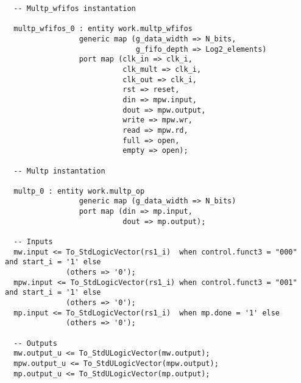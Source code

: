 \begin{code}
\begin{verbatim}
  -- Multp_wfifos instantation

  multp_wfifos_0 : entity work.multp_wfifos
                 generic map (g_data_width => N_bits,
                              g_fifo_depth => Log2_elements)
                 port map (clk_in => clk_i,
                           clk_mult => clk_i,
                           clk_out => clk_i,
                           rst => reset,
                           din => mpw.input,
                           dout => mpw.output,
                           write => mpw.wr,
                           read => mpw.rd,
                           full => open,
                           empty => open);

  -- Multp instantation

  multp_0 : entity work.multp_op
                 generic map (g_data_width => N_bits)
                 port map (din => mp.input,
                           dout => mp.output);

  -- Inputs
  mw.input <= To_StdLogicVector(rs1_i)  when control.funct3 = "000" and start_i = '1' else
              (others => '0');
  mpw.input <= To_StdLogicVector(rs1_i) when control.funct3 = "001" and start_i = '1' else
              (others => '0');
  mp.input <= To_StdLogicVector(rs1_i)  when mp.done = '1' else
              (others => '0');

  -- Outputs
  mw.output_u <= To_StdULogicVector(mw.output);
  mpw.output_u <= To_StdULogicVector(mpw.output);
  mp.output_u <= To_StdULogicVector(mp.output);


\end{verbatim}
\end{code}
